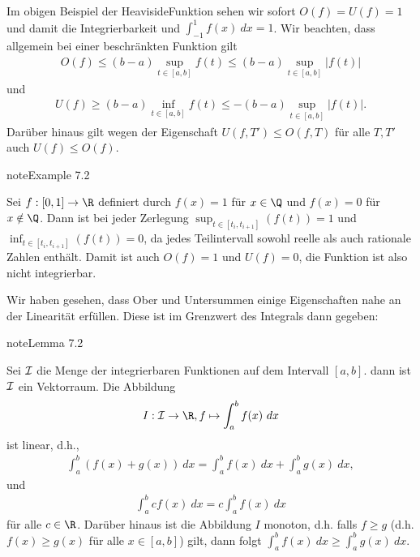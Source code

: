 \documentclass[letterpaper,10pt,english]{jupyterBook}
\begin{document}
Im obigen Beispiel der Heaviside\sphinxhyphen{}Funktion sehen wir sofort \(O(f)=U(f)=1\) und damit die Integrierbarkeit und
\(\int_{-1}^1 f(x)~dx = 1\).
Wir beachten, dass allgemein bei einer beschränkten Funktion gilt
\begin{equation*}
\begin{split}O(f) \leq (b-a) \sup_{t \in [a,b]}f(t) \leq  (b-a) \sup_{t \in [a,b]} \vert f(t) \vert\end{split}
\end{equation*}
und
\begin{equation*}
\begin{split}U(f) \geq (b-a) \inf_{t \in [a,b]}f(t) \leq -  (b-a) \sup_{t \in [a,b]} \vert f(t) \vert .\end{split}
\end{equation*}
Darüber hinaus gilt wegen der Eigenschaft \(U(f,T') \leq O(f,T)\) für alle \(T,T'\) auch \(U(f) \leq O(f)\).
\label{integration/riemann:example-1}
\begin{sphinxadmonition}{note}{Example 7.2}



Sei \(f:[0,1] \rightarrow \R\) definiert durch \(f(x) =1\) für \(x\in \Q\) und \(f(x)=0\) für \(x \notin \Q\). Dann ist bei jeder Zerlegung \(\sup_{t \in [t_i,t_{i+1}]}(f(t)) =1\) und \(\inf_{t \in [t_i,t_{i+1}]}(f(t))=0\), da jedes Teilintervall sowohl reelle als auch rationale Zahlen enthält. Damit ist auch \(O(f)=1\) und \(U(f) =0\), die Funktion ist also nicht integrierbar.
\end{sphinxadmonition}

Wir haben gesehen, dass Ober\sphinxhyphen{} und Untersummen einige Eigenschaften nahe an der Linearität erfüllen. Diese ist im Grenzwert des Integrals dann gegeben:
\label{integration/riemann:lemma-2}
\begin{sphinxadmonition}{note}{Lemma 7.2}



Sei \({\cal I}\) die Menge der integrierbaren Funktionen auf dem Intervall \([a,b]\). dann ist \({\cal I}\) ein Vektorraum. Die Abbildung
\begin{equation*}
\begin{split}I: {\cal I} \rightarrow \R, f \mapsto \int_a^b f(x)~dx\end{split}
\end{equation*}
ist linear, d.h.,
\begin{equation*}
\begin{split} \int_a^b (f(x)+g(x))~dx = \int_a^b f(x)~dx + \int_a^b g(x)~dx,\end{split}
\end{equation*}
und
\begin{equation*}
\begin{split} \int_a^b c f(x)~dx = c \int_a^b f(x)~dx\end{split}
\end{equation*}
für alle \(c \in \R\). Darüber hinaus ist die Abbildung \(I\) monoton, d.h. falls \(f \geq g\) (d.h. \(f(x) \geq g(x)\) für alle \(x\in[a,b]\)) gilt, dann folgt \(\int_a^b f(x)~dx \geq \int_a^b g(x)~dx. \)
\end{sphinxadmonition}
\end{document}
